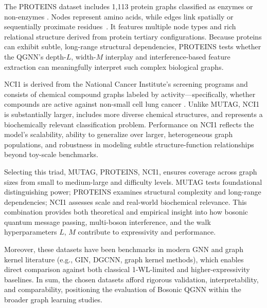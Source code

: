 \documentclass[11pt]{article}
\begin{document}
The PROTEINS dataset includes 1,113 protein graphs classified as enzymes or non-enzymes \citep{dobson2003enzymes,borgwardt2005proteins}. Nodes represent amino acids, while edges link spatially or sequentially proximate residues~. It features multiple node types and rich relational structure derived from protein tertiary configurations. Because proteins can exhibit subtle, long-range structural dependencies, PROTEINS tests whether the QGNN’s depth-$L$, width-$M$ interplay and interference-based feature extraction can meaningfully interpret such complex biological graphs.

NCI1 is derived from the National Cancer Institute’s screening programs and consists of chemical compound graphs labeled by activity—specifically, whether compounds are active against non-small cell lung cancer \citep{wale2008nci1}. Unlike MUTAG, NCI1 is substantially larger, includes more diverse chemical structures, and represents a biochemically relevant classification problem. Performance on NCI1 reflects the model’s scalability, ability to generalize over larger, heterogeneous graph populations, and robustness in modeling subtle structure-function relationships beyond toy-scale benchmarks.

Selecting this triad, MUTAG, PROTEINS, NCI1, ensures coverage across graph sizes from small to medium-large and difficulty levels. MUTAG tests foundational distinguishing power; PROTEINS examines structural complexity and long-range dependencies; NCI1 assesses scale and real-world biochemical relevance. This combination provides both theoretical and empirical insight into how bosonic quantum message passing, multi-boson interference, and the walk hyperparameters $L$, $M$ contribute to expressivity and performance.

Moreover, these datasets have been benchmarks in modern GNN and graph kernel literature (e.g., GIN, DGCNN, graph kernel methods)\citep{xu2019howpowerful,zhang2018dgcnn,shervashidze2011wl}, which enables direct comparison against both classical 1-WL-limited and higher-expressivity baselines. In sum, the chosen datasets afford rigorous validation, interpretability, and comparability, positioning the evaluation of Bosonic QGNN within the broader graph learning studies.



\end{document}
